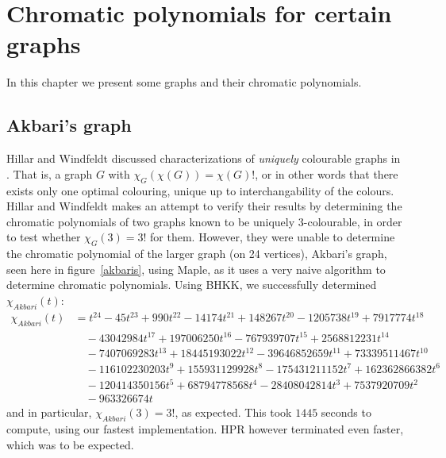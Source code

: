 \documentclass{cslthse-msc}
\begin{document}
\chapter{Chromatic polynomials for certain graphs}
In this chapter we present some graphs and their chromatic polynomials.

\section{Akbari's graph}
Hillar and Windfeldt discussed characterizations of \emph{uniquely} colourable graphs in \cite{hillar_windfeldt}. That is, a graph $G$ with $\chi_G(\chi(G)) = \chi(G)!$, or in other words that there exists only one optimal colouring, unique up to interchangability of the colours. Hillar and Windfeldt makes an attempt to verify their results by determining the chromatic polynomials of two graphs known to be uniquely 3-colourable, in order to test whether $\chi_G(3) = 3!$ for them. However, they were unable to determine the chromatic polynomial of the larger graph (on 24 vertices), Akbari's graph, seen here in figure~\ref{akbaris}, using Maple, as it uses a very naive algorithm to determine chromatic polynomials. Using BHKK, we successfully determined $\chi_{Akbari}(t)$:
\begin{equation*}
\begin{split}
\chi_{Akbari}(t) & =  t^{24} - 45t^{23} + 990t^{22} -14174t^{21} + 148267t^{20} - 1205738t^{19} + 7917774t^{18} \\ 
& \quad - 43042984t^{17} + 197006250t^{16} - 767939707t^{15} + 2568812231t^{14} \\ & \quad - 7407069283t^{13} 
+ 18445193022t^{12} - 39646852659t^{11} + 73339511467t^{10} \\ & \quad - 116102230203t^9 
+ 155931129928t^8 - 175431211152t^7 + 162362866382t^6 \\ & \quad - 120414350156t^5 
+ 68794778568t^4 - 28408042814t^3 + 7537920709t^2 \\ & \quad - 963326674t
\end{split}
\end{equation*}
and in particular, $\chi_{Akbari}(3) = 3!$, as expected. This took $1445$ seconds to compute, using our fastest implementation. HPR however terminated even faster, which was to be expected.
\end{document}
